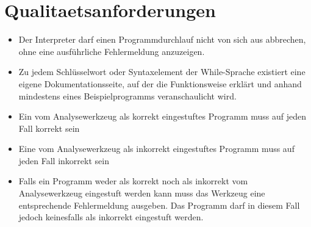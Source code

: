 \section{Qualitaetsanforderungen}%

\begin{itemize}%
    \item Der Interpreter darf einen Programmdurchlauf nicht von sich aus abbrechen, ohne eine ausführliche Fehlermeldung anzuzeigen.
    \item Zu jedem Schlüsselwort oder Syntaxelement der While-Sprache existiert eine eigene Dokumentationsseite, auf der die Funktionsweise erklärt und anhand mindestens eines Beispielprogramms veranschaulicht wird.
    \item Ein vom Analysewerkzeug als korrekt eingestuftes Programm muss auf jeden Fall korrekt sein
    \item Eine vom Analysewerkzeug als inkorrekt eingestuftes Programm muss auf jeden Fall inkorrekt sein
    \item Falls ein Programm weder als korrekt noch als inkorrekt vom Analysewerkzeug eingestuft werden kann muss das Werkzeug eine entsprechende Fehlermeldung ausgeben. Das Programm darf in diesem Fall jedoch keinesfalls als inkorrekt eingestuft werden.
\end{itemize}%
